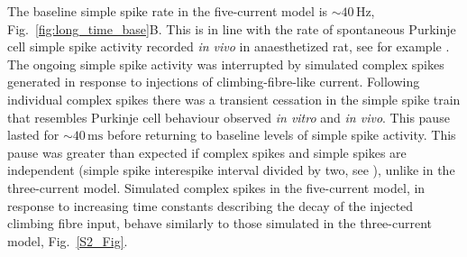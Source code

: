 \documentclass[twocolumn]{svjour3}          %
\newcommand{\mse}{\,\mathrm{ms}}
\newcommand{\hz}{\,\mathrm{Hz}}
\begin{document}
\begin{figure}
  \begin{center}
    
  \end{center}
  \end{figure}



The baseline simple spike rate in the five-current model is $\sim
40\hz$, Fig.~\ref{fig:long_time_base}B. This is in line with the rate
of spontaneous Purkinje cell simple spike activity recorded \textit{in
  vivo} in anaesthetized rat, see for example
\citet{BurroughsEtAl2016}.  The ongoing simple spike activity was
interrupted by simulated complex spikes generated in response to
injections of climbing-fibre-like current. Following individual
complex spikes there was a transient cessation in the simple spike
train that resembles Purkinje cell behaviour observed \textit{in
  vitro} and \textit{in vivo}. This pause lasted for $\sim 40\mse$
before returning to baseline levels of simple spike activity. This
pause was greater than expected if complex spikes and simple spikes
are independent (simple spike interespike interval divided by two, see
\citet{XiaoEtAl2014}), unlike in the three-current model. Simulated
complex spikes in the five-current model, in response to increasing
time constants describing the decay of the injected climbing fibre
input, behave similarly to those simulated in the three-current model,
Fig.~\ref{S2_Fig}.
\end{document}
